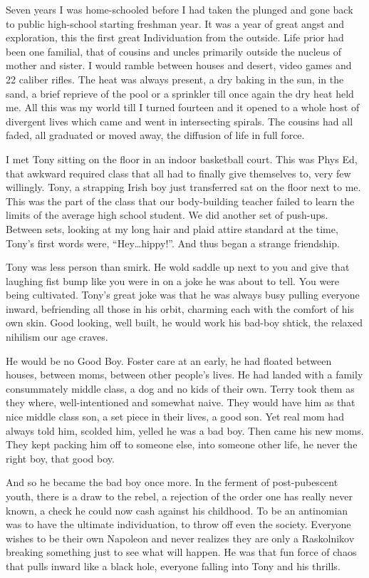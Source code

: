 \documentclass[ebook, 10pt, openright, onecolumn]{memoir}
\newcommand*\td[1]{
  \todo[inline]{
     #1 
  }
}
\newcommand*\finish{\td{ ----- Finish this section -----}}
\begin{document}
\finish

Seven years I was home-schooled before I had taken the plunged and gone back to
public high-school starting freshman year.  It was a year of great angst and
exploration, this the first great Individuation from the outside.  Life prior
had been one familial, that of cousins and uncles primarily outside the nucleus
of mother and sister.  I would ramble between houses and desert, video games and
22 caliber rifles.  The heat was always present, a dry baking in the sun, in the
sand, a brief reprieve of the pool or a sprinkler till once again the dry heat
held me.  All this was my world till I turned fourteen and it opened to a whole
host of divergent lives which came and went in intersecting spirals.  The
cousins had all faded, all graduated or moved away, the diffusion of life in
full force.

I met Tony sitting on the floor in an indoor basketball court.  This was Phys
Ed, that awkward required class that all had to finally give themselves to, very
few willingly.  Tony, a strapping Irish boy just transferred sat on the floor
next to me. This was the part of the class that our body-building teacher failed
to learn the limits of the average high school student.  We did another set of
push-ups. Between sets, looking at my long hair and plaid attire standard at the
time, Tony's first words were, ``Hey\ldots hippy!''.  And thus began a strange
friendship.

Tony was less person than smirk.  He wold saddle up next to you and give that
laughing fist bump like you were in on a joke he was about to tell.  You were
being cultivated.  Tony's great joke was that he was always busy pulling
everyone inward, befriending all those in his orbit, charming each with the
comfort of his own skin.  Good looking, well built, he would work his bad-boy
shtick, the relaxed nihilism our age craves.

He would be no Good Boy.  Foster care at an early, he had floated between
houses, between moms, between other people's lives.  He had landed with a family
consummately middle class, a dog and no kids of their own.  Terry took them as
they where, well-intentioned and somewhat naive.  They would have him as that
nice middle class son, a set piece in their lives, a good son.  Yet real mom had
always told him, scolded him, yelled he was a bad boy.  Then came his new moms.
They kept packing him off to someone else, into someone other life, he never the
right boy, that good boy. 

And so he became the bad boy once more.  In the ferment of post-pubescent youth,
there is a draw to the rebel, a rejection of the order one has really never
known, a check he could now cash against his childhood.  To be an antinomian was
to have the ultimate individuation, to throw off even the society.  Everyone
wishes to be their own Napoleon and never realizes they are only a Raskolnikov
breaking something just to see what will happen. He was that fun force of chaos
that pulls inward like a black hole, everyone falling into Tony and his thrills.
\end{document}
